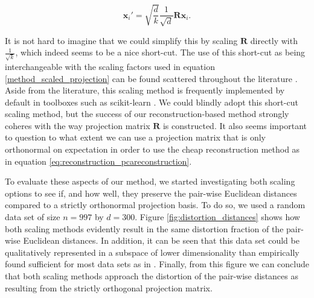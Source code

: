 \vspace{0.1cm}
\begin{equation}\label{method_scaled_projection}
	\mathbf{x}_i' = \sqrt{\frac{d}{k}} \frac{1}{\sqrt{d}} \mathbf{R} \mathbf{x}_i.
\end{equation}
\vspace{0.1cm}

It is not hard to imagine that we could simplify this by scaling $\mathbf{R}$ directly with $\frac{1}{\sqrt{k}}$, which indeed seems to be a nice short-cut. The use of this short-cut as being interchangeable with the scaling factors used in equation \eqref{method_scaled_projection} can be found scattered throughout the literature \cite{arriaga1999algorithmic,achlioptas2003database,fradkin2003experiments}. Aside from the literature, this scaling method is frequently implemented by default in toolboxes such as scikit-learn \cite{scikit2018random}. We could blindly adopt this short-cut scaling method, but the success of our reconstruction-based method strongly coheres with the way projection matrix $\mathbf{R}$ is constructed. It also seems important to question to what extent we can use a projection matrix that is only orthonormal on expectation in order to use the cheap reconstruction method as in equation \eqref{eq:reconstruction_pcareconstruction}.

To evaluate these aspects of our method, we started investigating both scaling options to see if, and how well, they preserve the pair-wise Euclidean distances compared to a strictly orthonormal projection basis. To do so, we used a random data set of size $n = 997$ by $d = 300$. Figure \ref{fig:distortion_distances} shows how both scaling methods evidently result in the same distortion fraction of the pair-wise Euclidean distances. In addition, it can be seen that this data set could be qualitatively represented in a subspace of lower dimensionality than empirically found sufficient for most data sets as in \cite{venkatasubramanian2011johnson}. Finally, from this figure we can conclude that both scaling methods approach the distortion of the pair-wise distances as resulting from the strictly orthogonal projection matrix. 

